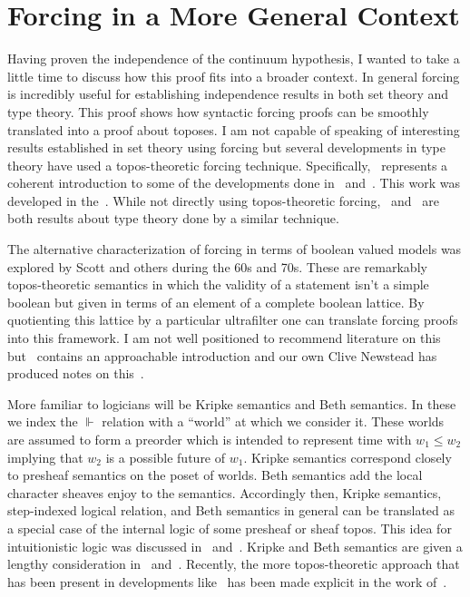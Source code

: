 \section{Forcing in a More General Context}\label{sec:conclusion}

Having proven the independence of the continuum hypothesis, I wanted
to take a little time to discuss how this proof fits into a broader
context. In general forcing is incredibly useful for establishing
independence results in both set theory and type theory. This proof
shows how syntactic forcing proofs can be smoothly translated into a
proof about toposes. I am not capable of speaking of interesting
results established in set theory using forcing but several
developments in type theory have used a topos-theoretic forcing
technique. Specifically,~\citet{Coquand:12} represents a coherent
introduction to some of the developments done in~\citet{Coquand:04}
and~\citet{Coquand:16}. This work was developed in
the~\citet{Jaber:14}. While not directly using topos-theoretic
forcing,~\citet{Escardo:13} and~\citet{Sterling:16} are both results
about type theory done by a similar technique.

The alternative characterization of forcing in terms of boolean valued
models was explored by Scott and others during the 60s and 70s. These
are remarkably topos-theoretic semantics in which the validity of a
statement isn't a simple boolean but given in terms of an element of a
complete boolean lattice. By quotienting this lattice by a particular
ultrafilter one can translate forcing proofs into this framework. I am
not well positioned to recommend literature on this
but~\citet{Jech:08} contains an approachable introduction and our own
Clive Newstead has produced notes on this~\cite{Newstead:12}.

More familiar to logicians will be Kripke semantics and Beth
semantics. In these we index the $\Vdash$ relation with a ``world'' at
which we consider it. These worlds are assumed to form a preorder
which is intended to represent time with $w_1 \le w_2$ implying that
$w_2$ is a possible future of $w_1$. Kripke semantics correspond
closely to presheaf semantics on the poset of worlds. Beth semantics
add the local character sheaves enjoy to the semantics. Accordingly
then, Kripke semantics, step-indexed logical relation, and Beth
semantics in general can be translated as a special case of the
internal logic of some presheaf or sheaf topos. This idea for
intuitionistic logic was discussed in~\citet{Fourman:82}
and~\citet{Fourman:13}. Kripke and Beth semantics are given a lengthy
consideration in~\citet{Dummett:00}
and~\citet{Troelstra:88}. Recently, the more topos-theoretic approach
that has been present in developments like~\citet{Dreyer:09} has been
made explicit in the work of~\citet{Birkedal:11}.
